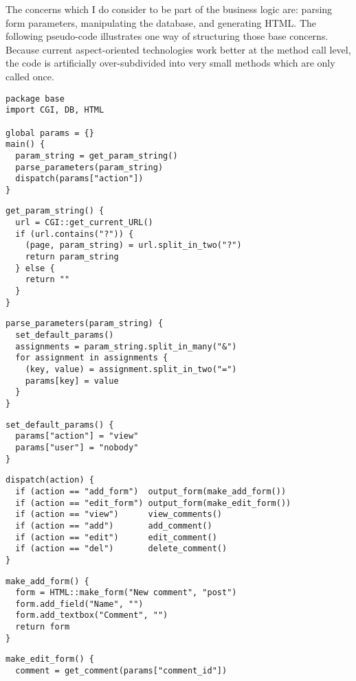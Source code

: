 \documentclass{article}
\begin{document}
\begin{multicols}{2}
The concerns which I do consider to be part of the business logic are: parsing form parameters, manipulating the database, and generating HTML. The following pseudo-code illustrates one way of structuring those base concerns. Because current aspect-oriented technologies work better at the method call level, the code is artificially over-subdivided into very small methods which are only called once.

{\smaller
\begin{verbatim}
package base
import CGI, DB, HTML

global params = {}
main() {
  param_string = get_param_string()
  parse_parameters(param_string)
  dispatch(params["action"])
}
\end{verbatim}

\begin{verbatim}
get_param_string() {
  url = CGI::get_current_URL()
  if (url.contains("?")) {
    (page, param_string) = url.split_in_two("?")
    return param_string
  } else {
    return ""
  }
}
\end{verbatim}

\begin{verbatim}
parse_parameters(param_string) {
  set_default_params()
  assignments = param_string.split_in_many("&")
  for assignment in assignments {
    (key, value) = assignment.split_in_two("=")
    params[key] = value
  }
}
\end{verbatim}

\begin{verbatim}
set_default_params() {
  params["action"] = "view"
  params["user"] = "nobody"
}
\end{verbatim}

\begin{verbatim}
dispatch(action) {
  if (action == "add_form")  output_form(make_add_form())
  if (action == "edit_form") output_form(make_edit_form())
  if (action == "view")      view_comments()
  if (action == "add")       add_comment()
  if (action == "edit")      edit_comment()
  if (action == "del")       delete_comment()
}
\end{verbatim}

\begin{verbatim}
make_add_form() {
  form = HTML::make_form("New comment", "post")
  form.add_field("Name", "")
  form.add_textbox("Comment", "")
  return form
}
\end{verbatim}

\begin{verbatim}
make_edit_form() {
  comment = get_comment(params["comment_id"])
  

\end{verbatim}}
\end{multicols}
\end{document}
